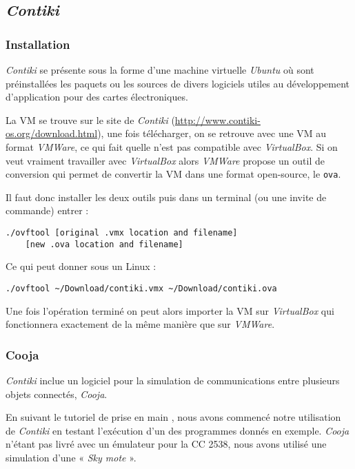 \subsection{\emph{Contiki}}

\subsubsection{Installation}

\emph{Contiki} se présente sous la forme d’une machine virtuelle \emph{Ubuntu} où sont préinstallées les paquets ou les sources de divers logiciels utiles au développement d’application pour des cartes électroniques.

La VM se trouve sur le site de \emph{Contiki} (\url{http://www.contiki-os.org/download.html}), une fois télécharger, on se retrouve avec une VM au format \emph{VMWare}, ce qui fait quelle n'est pas compatible avec \emph{VirtualBox}.
Si on veut vraiment travailler avec \emph{VirtualBox} alors \emph{VMWare} propose un outil de conversion qui permet de convertir la VM dans une format open-source, le \texttt{ova}.

Il faut donc installer les deux outils puis dans un terminal (ou une invite de commande) entrer :
\begin{verbatim}
./ovftool [original .vmx location and filename]
	[new .ova location and filename]
\end{verbatim}
Ce qui peut donner sous un Linux :
\begin{verbatim}
./ovftool ~/Download/contiki.vmx ~/Download/contiki.ova
\end{verbatim}

Une fois l'opération terminé on peut alors importer la VM sur \emph{VirtualBox} qui fonctionnera exactement de la même manière que sur \emph{VMWare}.
 
\subsubsection{Cooja}

\emph{Contiki} inclue un logiciel pour la simulation de communications entre plusieurs objets connectés, \emph{Cooja}.

En suivant le tutoriel de prise en main , nous avons commencé notre utilisation de \emph{Contiki} en testant l’exécution d’un des programmes donnés en exemple.
\emph{Cooja} n’étant pas livré avec un émulateur pour la CC 2538, nous avons utilisé une simulation d’une « \textit{Sky mote} ».

